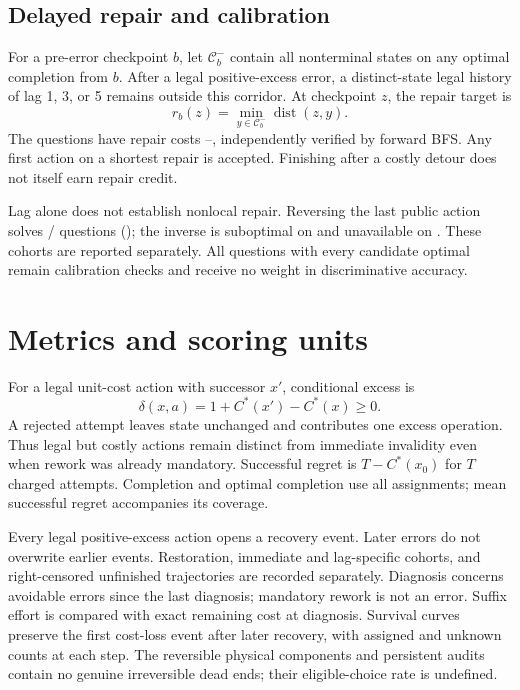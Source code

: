 \documentclass[10pt,twocolumn,letterpaper]{article}
\begin{document}
\subsection{Delayed repair and calibration}
For a pre-error checkpoint $b$, let $\mathcal C_b^{-}$ contain all
nonterminal states on any optimal completion from $b$. After a legal
positive-excess error, a distinct-state legal history of lag 1, 3, or 5
remains outside this corridor. At checkpoint $z$, the repair target is
\begin{equation}
 r_b(z)=\min_{y\in\mathcal C_b^{-}}\operatorname{dist}(z,y).
\end{equation}
The \RepairCount{} questions have repair costs \RepairMin{}--\RepairMax{}, independently verified by
forward BFS. Any first action on a shortest repair is accepted.
Finishing after a costly detour does not itself earn repair credit.

Lag alone does not establish nonlocal repair. Reversing the last public
action solves \InverseCorrect{}/\RepairCount{} questions (\InverseAccuracy{});
the inverse is suboptimal on \InverseSuboptimal{} and unavailable on
\InverseUnavailable{}. These cohorts are reported separately.
All \CalibrationCount{} questions with every candidate optimal remain
calibration checks and receive no weight in discriminative accuracy.

\section{Metrics and scoring units}
For a legal unit-cost action with successor $x'$, conditional excess is
\begin{equation}
 \delta(x,a)=1+C^*(x')-C^*(x)\geq0.
\end{equation}
A rejected attempt leaves state unchanged and contributes one excess
operation. Thus legal but costly actions remain distinct from immediate
invalidity even when rework was already mandatory. Successful regret
is $T-C^*(x_0)$ for $T$ charged attempts. Completion and optimal completion
use all assignments; mean successful regret accompanies its coverage.

Every legal positive-excess action opens a recovery event. Later errors
do not overwrite earlier events. Restoration, immediate and lag-specific
cohorts, and right-censored unfinished trajectories are recorded
separately. Diagnosis concerns avoidable errors since the last diagnosis;
mandatory rework is not an error. Suffix effort is compared with exact
remaining cost at diagnosis. Survival curves preserve the first cost-loss
event after later recovery, with assigned and unknown counts at each step.
The reversible physical components and persistent audits contain no
genuine irreversible dead ends; their eligible-choice rate is undefined.
\end{document}
